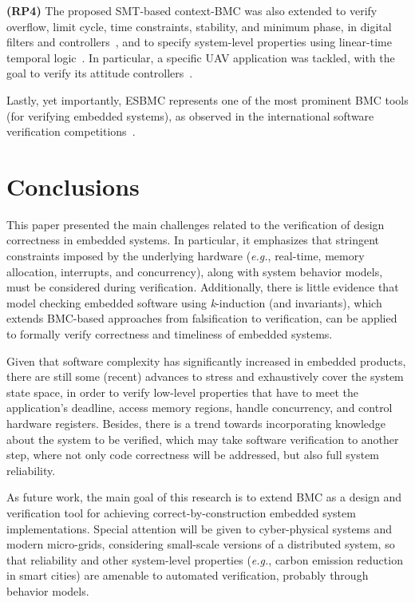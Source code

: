 \documentclass{acm_sen_article}
\begin{document}
\textbf{(RP4)} The proposed SMT-based context-BMC was also extended to verify overflow, limit cycle, time constraints, stability, and minimum phase, in digital filters and controllers~\cite{dsv_spin2015,esbmc_controller,esbmc_filter}, and to specify system-level properties using linear-time temporal logic~\cite{JMorse15}. In particular, a specific UAV application was tackled, with the goal to verify its attitude controllers~\cite{Bessa16}. 

Lastly, yet importantly, ESBMC represents one of the most prominent BMC tools (for verifying embedded systems), as observed in the international software verification competitions~\cite{MorseCNF13,MorseRCN014}.





\section{Conclusions}
\label{conclusions}

This paper presented the main challenges related to the verification of design correctness in embedded systems. In particular, it emphasizes that stringent constraints imposed by the underlying hardware ({\it e.g.}, real-time, memory allocation, interrupts, and concurrency), along with system behavior models, must be considered during verification. Additionally, there is little evidence that model checking embedded software using \textit{k}-induction (and invariants), which
extends BMC-based approaches from falsification to verification, can be applied to formally verify correctness and timeliness of embedded systems. 

Given that software complexity has significantly increased in embedded products, there are still some (recent) advances to stress and exhaustively cover the system state space, in order to verify low-level properties that have to meet the application's deadline, access memory regions, handle concurrency, and control hardware registers. Besides, there is a trend towards incorporating knowledge about the system to be verified, which may take software verification to another step, where not only code correctness will be addressed, but also full system reliability. 

As future work, the main goal of this research is to extend BMC as a design and verification tool for achieving correct-by-construction embedded system implementations. Special attention will be given to cyber-physical systems and modern micro-grids, considering small-scale versions of a distributed system, so that reliability and other system-level properties ({\it e.g.}, carbon emission reduction in smart cities) are amenable to automated verification, probably through behavior models.
\end{document}
